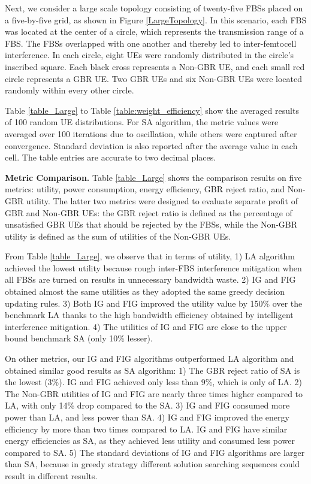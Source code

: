 \documentclass[conference]{IEEEtran}
\begin{document}
Next, we consider a large scale topology consisting of twenty-five FBSs placed on a five-by-five grid, as shown in Figure \ref{LargeTopology}. In this scenario, each FBS was located at the center of a circle, which represents the transmission range of a FBS. The FBSs overlapped with one another and thereby led to inter-femtocell interference. In each circle, eight UEs were randomly distributed in the circle's inscribed square. Each black cross represents a Non-GBR UE, and each small red circle represents a GBR UE. Two GBR UEs and six Non-GBR UEs were located randomly within every other circle.

Table \ref{table_Large} to Table \ref{table:weight_efficiency} show the averaged results of 100 random UE distributions. For SA algorithm, the metric values were averaged over 100 iterations due to oscillation, while others were captured after convergence. Standard deviation is also reported after the average value in each cell. The table entries are accurate to two decimal places.


\noindent \textbf{Metric Comparison.} Table \ref{table_Large} shows the comparison results on five metrics: utility, power consumption, energy efficiency, GBR reject ratio, and Non-GBR utility. The latter two metrics were designed to evaluate separate profit of GBR and Non-GBR UEs: the GBR reject ratio is defined as the percentage of unsatisfied GBR UEs that should be rejected by the FBSs, while the Non-GBR utility is defined as the sum of utilities of the Non-GBR UEs. 


From Table \ref{table_Large}, we observe that in terms of utility, 1) LA algorithm achieved the lowest utility because rough inter-FBS interference mitigation when all FBSs are turned on results in unnecessary bandwidth waste. 2) IG and FIG obtained almost the same utilities as they adopted the same greedy decision updating rules. 3) Both IG and FIG improved the utility value by 150\% over the benchmark LA thanks to the high bandwidth efficiency obtained by intelligent interference mitigation. 4) The utilities of IG and FIG are close to the upper bound benchmark SA (only 10\% lesser).


On other metrics, our IG and FIG algorithms outperformed LA algorithm and obtained similar good results as SA algorithm: 1) The GBR reject ratio of SA is the lowest (3\%). IG and FIG achieved only less than 9\%, which is only  of LA. 2) The Non-GBR utilities of IG and FIG are nearly three times higher compared to LA, with only 14\% drop compared to the SA. 3) IG and FIG consumed more power than LA, and less power than SA. 4) IG and FIG improved the energy efficiency by more than two times compared to LA. IG and FIG have similar energy efficiencies as SA, as they achieved less utility and consumed less power compared to SA. 5) The standard deviations of IG and FIG algorithms are larger than SA, because in greedy strategy different solution searching sequences could result in different results.
\end{document}
